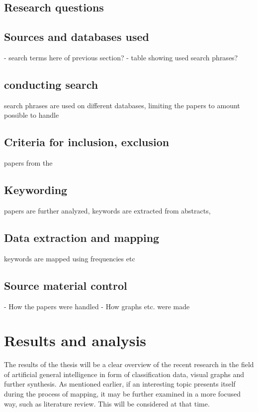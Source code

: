 \documentclass[utf8,english]{gradu3}
\begin{document}
\section{Research questions}

\section{Sources and databases used}
- search terms here of previous section? 
- table showing used search phrases?

\section{conducting search}
search phrases are used on different databases, limiting the papers to amount possible to handle

\section{Criteria for inclusion, exclusion}
papers from the 

\section{Keywording}
papers are further analyzed, keywords are extracted from abstracts, 

\section{Data extraction and mapping}
keywords are mapped using frequencies etc

\section{Source material control}
- How the papers were handled
- How graphs etc. were made

\chapter{Results and analysis}
The results of the thesis will be a clear overview of the recent research in the field of artificial general intelligence in form of classification data, visual graphs and further synthesis. As mentioned earlier, if an interesting topic presents itself during the process of mapping, it may be further examined in a more focused way, such as literature review. This will be considered at that time.
\end{document}
